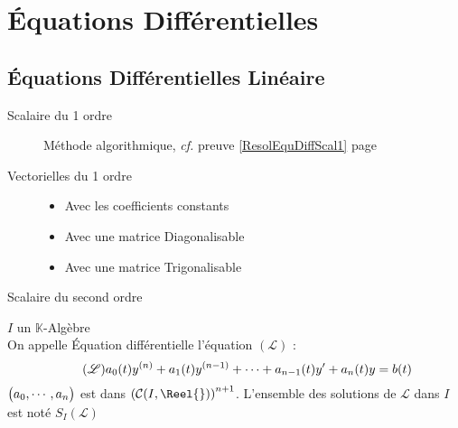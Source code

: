 \documentclass[11pt,a4paper,fleqn,pdftex]{report}
\begin{document}
\part{Équations Différentielles}
\chapter{Équations Différentielles Linéaire}
\begin{methode}
\begin{description}
    \item[Scalaire du 1\ier{} ordre]
                Méthode algorithmique, \textit{cf.} preuve \ref{ResolEquDiffScal1} page \pageref{ResolEquDiffScal1}
    \item[Vectorielles du 1\ier{} ordre] \hfill
    \begin{itemize}\itemsep2pt %
                    \item Avec les coefficients constants
                    \item Avec une matrice Diagonalisable
                    \item Avec une matrice Trigonalisable
    \end{itemize}

    \item[Scalaire du second ordre]
\end{description}

\end{methode}

\begin{dfn}
$I$ un $\mathbb{K}$-Algèbre\\
On appelle Équation différentielle l'équation $(\mathscr{L})$ :
\begin{equation}\tag{\ensuremath{\mathscr{L}}}
a_0(t)y^{(n)}+a_1(t) y^{(n-1)}+\cdots + a_{n-1}(t) y' + a_n(t) y = b(t)
\end{equation}
$\left( \vphantom{3^3} a_0,\cdots ,a_n \right)$ est dans $\left( \mathcal{C}(I,\Reel{})\right)^{n+1} $. L'ensemble des solutions de $\mathscr{L}$ dans $I$ est noté $S_I(\mathscr{L})$
\end{dfn}
\end{document}
